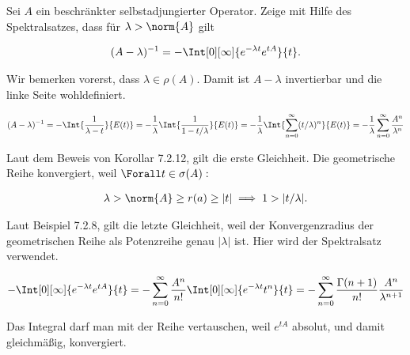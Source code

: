 \begin{exercise}[37/3]

Sei $A$ ein beschränkter selbstadjungierter Operator.
Zeige mit Hilfe des Spektralsatzes, dass für $\lambda > \norm{A}$ gilt

\begin{align*}
  (A - \lambda)^{-1}
  =
  -\Int[0][\infty]{e^{-\lambda t} e^{t A}}{t}.
\end{align*}

\end{exercise}

\begin{solution}

\phantom{}


Wir bemerken vorerst, dass $\lambda \in \rho(A)$.
Damit ist $A - \lambda$ invertierbar und die linke Seite wohldefiniert.

\begin{align*}
  (A - \lambda)^{-1}
  =
  -\Int{\frac{1}{\lambda - t}}{E(t)}
  =
  -\frac{1}{\lambda}
  \Int{\frac{1}{1 - t / \lambda}}{E(t)}
  =
  -\frac{1}{\lambda}
  \Int{\sum_{n=0}^\infty (t / \lambda)^n}{E(t)}
  =
  -\frac{1}{\lambda}
  \sum_{n=0}^\infty
  \frac{A^n}{\lambda^n}
\end{align*}


Laut dem Beweis von Korollar 7.2.12, gilt die erste Gleichheit.
Die geometrische Reihe konvergiert, weil $\Forall t \in \sigma(A):$

\begin{align*}
  \lambda > \norm{A} \geq r(a) \geq |t|
  \implies
  1 > |t / \lambda|.
\end{align*}


Laut Beispiel 7.2.8, gilt die letzte Gleichheit, weil der Konvergenzradius der geometrischen Reihe als Potenzreihe genau $|\lambda|$ ist.
Hier wird der Spektralsatz verwendet.

\begin{align*}
  -\Int[0][\infty]{e^{-\lambda t} e^{t A}}{t}
  =
  -\sum_{n=0}^\infty
  \frac{A^n}{n!}
  \Int[0][\infty]{e^{-\lambda t} t^n}{t}
  =
  -\sum_{n=0}^\infty
  \frac{\Gamma(n+1)}{n!}
  \frac{A^n}{\lambda^{n+1}}
\end{align*}

Das Integral darf man mit der Reihe vertauschen, weil $e^{t A}$ absolut, und damit gleichmäßig, konvergiert.


\end{solution}
